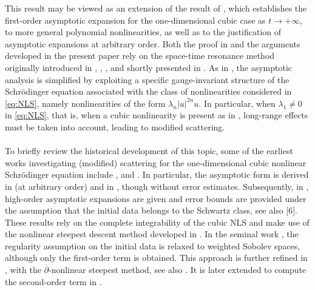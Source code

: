 \documentclass[a4paper, 15pt]{article}
\numberwithin{equation}{section}
\begin{document}
This result may be viewed as an extension of the result of \cite{zbMATH06033880}, which establishes the first-order asymptotic expansion for the one-dimensional cubic case as $t\to+\infty$, to more general polynomial nonlinearities, as well as to the justification of asymptotic expansions at arbitrary order. Both the proof in \cite{zbMATH06033880} and the arguments developed in the present paper rely on the space-time resonance method originally introduced in \cite{zbMATH05528925}, \cite{zbMATH05590422}, \cite{germain2010globalexistencecoupledkleingordon}, and shortly presented in \cite{germain2011spacetimeresonances}. As in \cite{zbMATH06033880}, the asymptotic analysis is simplified by exploiting a specific gauge-invariant structure of the Schrödinger equation associated with the class of nonlinearities considered in \eqref{eq:NLS}, namely nonlinearities of the form $\lambda_n|u|^{2n}u$. In particular, when $\lambda_1\neq0$ in \eqref{eq:NLS}, that is, when a cubic nonlinearity is present as in \cite{zbMATH06033880}, long-range effects must be taken into account, leading to modified scattering.\\\\
To briefly review the historical development of this topic, some of the earliest works investigating (modified) scattering for the one-dimensional cubic nonlinear Schrödinger equation include \cite{6b42dcf7d8904df8ad13134b93af053b}, \cite{10.1063/1.522967} and \cite{1976ZhETF..71..203Z}. In particular, the asymptotic form is derived in \cite{10.1063/1.522967} (at arbitrary order) and in \cite{1976ZhETF..71..203Z}, though without error estimates. Subsequently, in \cite{zbMATH00722094}, high-order asymptotic expansions are given and error bounds are provided under the assumption that the initial data belongs to the Schwartz class, see also [6]. These results rely on the complete integrability of the cubic NLS and make use of the nonlinear steepest descent method developed in \cite{deift1992steepestdescentmethodoscillatory}. In the seminal work \cite{zbMATH01981617}, the regularity assumption on the initial data is relaxed to weighted Sobolev spaces, although only the first-order term is obtained. This approach is further refined in \cite{dieng2008longtimeasymptoticsnlsequation}, with the $\overline{\partial}$-nonlinear steepest method, see also \cite{dieng2018dispersiveasymptoticslinearintegrable}. It is later extended to compute the second-order term in \cite{liu2024higherorderasymptoticsnonlinear}.\\\\
\end{document}
